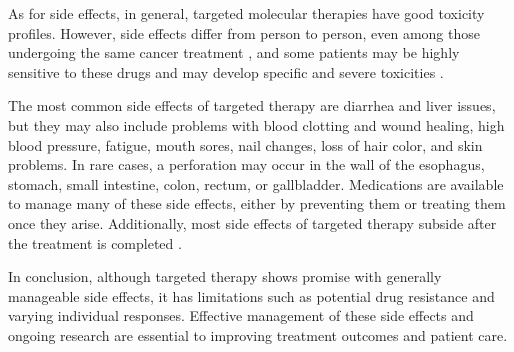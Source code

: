 As for side effects, in general, targeted molecular therapies have good toxicity profiles. However, side effects differ from person to person, even among those undergoing the same cancer treatment \cite{nih_se}, and some patients may be highly sensitive to these drugs and may develop specific and severe toxicities \cite{se_tt}.

The most common side effects of targeted therapy are diarrhea and liver issues, but they may also include problems with blood clotting and wound healing, high blood pressure, fatigue, mouth sores, nail changes, loss of hair color, and skin problems. In rare cases, a perforation may occur in the wall of the esophagus, stomach, small intestine, colon, rectum, or gallbladder. Medications are available to manage many of these side effects, either by preventing them or treating them once they arise. Additionally, most side effects of targeted therapy subside after the treatment is completed \cite{target_therapy1}.

In conclusion, although targeted therapy shows promise with generally manageable side effects, it has limitations such as potential drug resistance and varying individual responses. Effective management of these side effects and ongoing research are essential to improving treatment outcomes and patient care.

